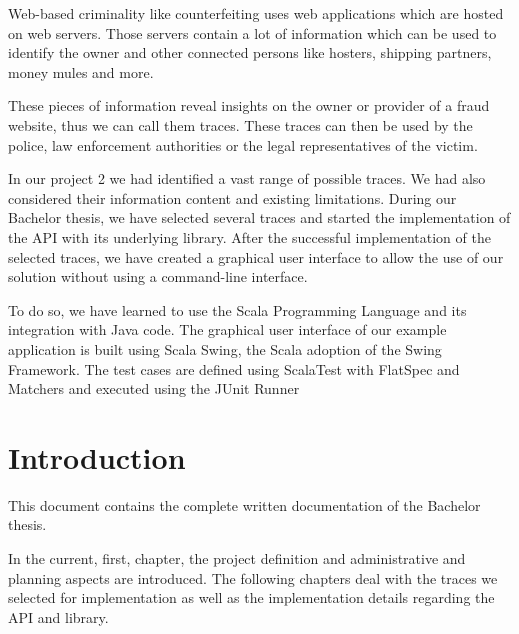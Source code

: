 \documentclass[
	a4paper,					10pt,							twoside,					openright,				notitlepage,			parskip=half,			]{scrreprt}
\begin{document}
Web-based criminality like counterfeiting uses web applications which are 
hosted on web servers. Those servers contain a lot of information which 
can be used to identify the owner and other connected persons like hosters, 
shipping partners, money mules and more. 

These pieces of information reveal insights on the owner or provider of a 
fraud website, thus we can call them traces. These traces can then be used
by the police, law enforcement authorities or the legal representatives of 
the victim.

In our project 2 we had identified a vast range of possible traces. 
We had also considered their information content and existing limitations. 
During our Bachelor thesis, we have selected several traces and 
started the implementation of the API with its underlying library. 
After the successful implementation of the selected traces, we have created
a graphical user interface to allow the use of our solution without 
using a command-line interface.

To do so, we have learned to use the Scala Programming Language and its 
integration with Java code. The graphical user interface of our example application is
built using Scala Swing, the Scala adoption of the Swing Framework.
The test cases are defined using ScalaTest with FlatSpec and Matchers and executed using the JUnit Runner
\clearpage{}
\cleardoubleemptypage


\begingroup
\let\cleardoublepage\relax
\let\clearpage\relax

\tableofcontents
\cleardoublepage


\newpage
\cleardoublepage
{} 
{}
\listoffigures
{} 
{}
\listoftables
\endgroup
\cleardoublepage
{} 
{}
\renewcommand{\glossaryname}{Glossary}
\printglossary
\cleardoublepage
{}

\clearpage{}\chapter{Introduction} \label{chap:intro}

This document contains the complete written documentation of the Bachelor thesis.
 
In the current, first, chapter, the project definition and administrative and planning aspects
are introduced. The following chapters deal with the traces we selected for implementation
as well as the implementation details regarding the \gls{API} and library.
\end{document}
